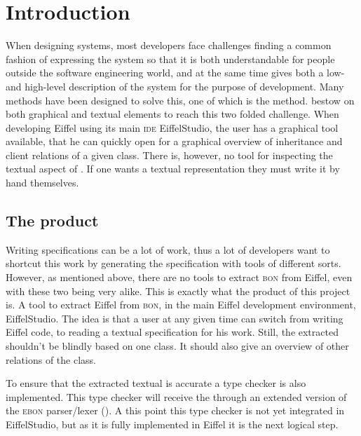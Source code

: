 \chapter{Introduction}
\label{sec:introduction}
When designing systems, most developers face challenges finding a common fashion of expressing the system so that it is both understandable for people outside the software engineering world, and at the same time gives both a low- and high-level description of the system for the purpose of development. Many methods have been designed to solve this, one of which is the \bon{ } method. \bon{ } bestow on both graphical and textual elements to reach this two folded challenge. When developing Eiffel using its main \textsc{ide} EiffelStudio, the user has a graphical \bon{ } tool available, that he can quickly open for a graphical overview of inheritance and client relations of a given class. There is, however, no tool for inspecting the textual aspect of \bon. If one wants a textual representation they must write it by hand themselves.
\section{The product}
Writing specifications can be a lot of work, thus a lot of developers want to shortcut this work by generating the specification with tools of different sorts. However, as mentioned above, there are no tools to extract \textsc{bon} from Eiffel, even with these two being very alike. This is exactly what the product of this project is. A tool to extract Eiffel from \textsc{bon}, in the main Eiffel development environment, EiffelStudio. The idea is that a user at any given time can switch from writing Eiffel code, to reading a textual \bon{ } specification for his work. Still, the extracted \bon{ } shouldn't be blindly based on one class. It should also give an overview of other relations of the class.

To ensure that the extracted textual \bon{ } is accurate a type checker is also implemented. This type checker will receive the \bon{ } through an extended version of the \textsc{ebon} parser/lexer (\cite{ebon}). A this point this type checker is not yet integrated in EiffelStudio, but as it is fully implemented in Eiffel it is the next logical step. 
